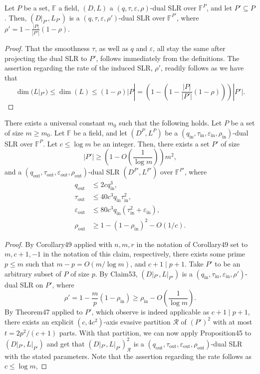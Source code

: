 \begin{ntclaim}
Let $P$ be a set, $\mathbb F$ a field, $(D,L)$ a $(q,\tau,\varepsilon,\rho)$-dual SLR over $\mathbb F^P$, and let $P'\subseteq P$. Then, $(D|_{P'},L_{P'})$ is a $(q,\tau,\varepsilon,\rho')$-dual SLR over $\mathbb F^{P'}$, where $\rho'=1-\frac{|P|}{|P'|}(1-\rho)$.
\end{ntclaim}
\begin{proof}
That the smoothness $\tau$, as well as $q$ and $\varepsilon$, all stay the same after projecting the dual SLR to $P'$, follows immediately from the definitions. The assertion regarding the rate of the induced SLR, $\rho'$, readily follows as we have that
\[\dim(L|_{P'})\leq\dim(L)\leq(1-\rho)|P|=\left(1-\left(1-\frac{|P|}{|P'|}(1-\rho)\right)\right)|P'|.\]
\end{proof}
\begin{ntclaim}
There exists a universal constant $m_0$ such that the following holds. Let $P$ be a set of size $m\geq m_0$. Let $\mathbb F$ be a field, and let $(D^P,L^P)$ be a $(q_{\mathrm{in}},\tau_{\mathrm{in}},\varepsilon_{\mathrm{in}},\rho_{\mathrm{in}})$-dual SLR over $\mathbb F^P$. Let $c\leq\log m$ be an integer. Then, there exists a set $P'$ of size
\[|P'|\geq\left(1-O\left(\frac1{\log m}\right)\right)m^2,\]
and a $(q_{\mathrm{out}},\tau_{\mathrm{out}},\varepsilon_{\mathrm{out}},\rho_{\mathrm{out}})$-dual SLR $(D^{P'},L^{P'})$ over $\mathbb F^{P'}$, where
\begin{align*}q_{\mathrm{out}}&\leq2cq_{\mathrm{in}}^3,\\\tau_{\mathrm{out}}&\leq40c^3q_{\mathrm{in}}\tau_{\mathrm{in}}^2,\\\varepsilon_{\mathrm{out}}&\leq80c^3q_{\mathrm{in}}(\tau_{\mathrm{in}}^2+\varepsilon_{\mathrm{in}}),\\\rho_{\mathrm{out}}&\geq1-(1-\rho_{\mathrm{in}})^2-O(1/c).\end{align*}
\end{ntclaim}
\begin{proof}
By Corollary49 applied with $n,m,r$ in the notation of Corollary49 set to $m,c+1,-1$ in the notation of this claim, respectively, there exists some prime $p\leq m$ such that $m-p=O(m/\log m)$, and $c+1\mid p+1$. Take $P'$ to be an arbitrary subset of $P$ of size $p$. By Claim53, $(D|_{P'},L|_{P'})$ is a $(q_{\mathrm{in}},\tau_{\mathrm{in}},\varepsilon_{\mathrm{in}},\rho')$-dual SLR on $P'$, where
\[\rho'=1-\frac mp(1-\rho_{\mathrm{in}})\geq\rho_{\mathrm{in}}-O\left(\frac1{\log m}\right).\]
By Theorem47 applied to $P'$, which observe is indeed applicable as $c+1\mid p+1$, there exists an explicit $(c,4c^2)$-axis evasive partition $\mathcal R$ of $(P')^2$ with at most $t=2p^2/(c+1)$ parts. With that partition, we can now apply Proposition45 to $(D|_{P'},L|_{P'})$ and get that $(D|_{P'},L|_{P'})^2_{\mathcal R}$ is a $(q_{\mathrm{out}},\tau_{\mathrm{out}},\varepsilon_{\mathrm{out}},\rho_{\mathrm{out}})$-dual SLR with the stated parameters. Note that the assertion regarding the rate follows as $c\leq\log m$,
\end{proof}

